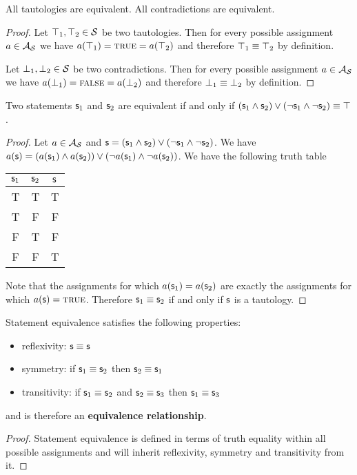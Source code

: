 \documentclass[11pt,letterpaper,fleqn]{memoir} %
\begin{document}
\begin{mathSection}

\begin{coro}
	All tautologies are equivalent. All contradictions are equivalent.
\end{coro}
\begin{proof}
	Let $\top_1, \top_2 \in \mathcal{S}$ be two tautologies. Then for every possible assignment $a \in \mathcal{A}_{\mathcal{S}}$ we have $a(\top_1) = \textsc{true} = a(\top_2)$ and therefore $\top_1 \equiv \top_2$ by definition.
	
	Let $\bot_1, \bot_2 \in \mathcal{S}$ be two contradictions. Then for every possible assignment $a \in \mathcal{A}_{\mathcal{S}}$ we have $a(\bot_1) = \textsc{false} = a(\bot_2)$ and therefore $\bot_1 \equiv \bot_2$ by definition.
\end{proof}

\begin{coro}
	Two statements $\mathsf{s}_1$ and $\mathsf{s}_2$ are equivalent if and only if $(\mathsf{s}_1 \wedge \mathsf{s}_2) \vee (\neg\mathsf{s}_1 \wedge \neg\mathsf{s}_2) \equiv \top$.
\end{coro}
\begin{proof}
	Let $a \in \mathcal{A}_{\mathcal{S}}$ and $\mathsf{s} = ( \mathsf{s}_1 \wedge \mathsf{s}_2) \vee (\neg\mathsf{s}_1 \wedge \neg\mathsf{s}_2)$. We have $a(\mathsf{s}) = (a(\mathsf{s}_1) \wedge a(\mathsf{s}_2)) \vee (\neg a(\mathsf{s}_1) \wedge \neg a(\mathsf{s}_2))$. We have the following truth table
	\begin{center}
	\begin{tabular}{c|c|c}
		$\mathsf{s}_1$ & $\mathsf{s}_2$ & $\mathsf{s}$\\
		\hline
		T & T & T \\
		T & F & F \\
		F & T & F \\
		F & F & T\\
	\end{tabular}
	\end{center}
	Note that the assignments for which $a(\mathsf{s}_1) = a(\mathsf{s}_2)$ are exactly the assignments for which $a(\mathsf{s}) = \textsc{true}$. Therefore $\mathsf{s}_1 \equiv \mathsf{s}_2$ if and only if $\mathsf{s}$ is a tautology.
\end{proof}

\begin{coro}
	Statement equivalence satisfies the following properties:
	\begin{itemize}
		\item reflexivity: $\mathsf{s} \equiv \mathsf{s}$
		\item symmetry: if $\mathsf{s}_1 \equiv \mathsf{s}_2$ then $\mathsf{s}_2 \equiv \mathsf{s}_1$
		\item transitivity: if $\mathsf{s}_1 \equiv \mathsf{s}_2$ and $\mathsf{s}_2 \equiv \mathsf{s}_3$ then $\mathsf{s}_1 \equiv \mathsf{s}_3$
	\end{itemize}
	and is therefore an \textbf{equivalence relationship}.
\end{coro}
\begin{proof}
	Statement equivalence is defined in terms of truth equality within all possible assignments and will inherit reflexivity, symmetry and transitivity from it.
\end{proof}


\end{mathSection}
\end{document}
